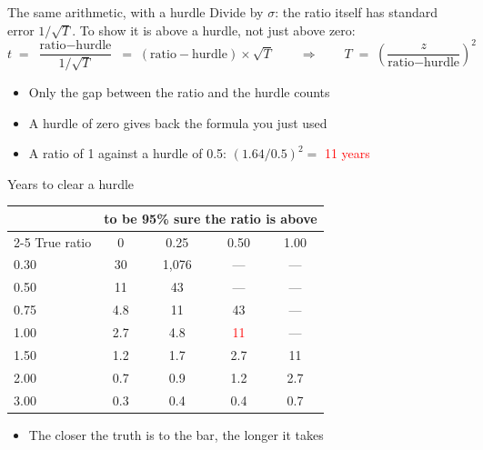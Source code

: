 \documentclass[aspectratio=169,10pt]{beamer}
\begin{document}
\begin{frame}{The same arithmetic, with a hurdle}
Divide by $\sigma$: the ratio itself has standard error $1/\sqrt{T}$. To show it is above a hurdle, not just above zero:
\vskip 6pt
\[ t \;=\; \frac{\text{ratio} - \text{hurdle}}{1/\sqrt{T}} \;=\; (\text{ratio} - \text{hurdle}) \times \sqrt{T}
   \qquad\Longrightarrow\qquad T \;=\; \left(\frac{z}{\text{ratio} - \text{hurdle}}\right)^{2} \]
\vskip 6pt
\begin{itemize}
\item Only the gap between the ratio and the hurdle counts
\vskip 6pt
\item A hurdle of zero gives back the formula you just used
\vskip 6pt
\item A ratio of 1 against a hurdle of 0.5: $(1.64 / 0.5)^2 = $ \textcolor{red}{11 years}
\end{itemize}
\end{frame}

\begin{frame}{Years to clear a hurdle}
\begin{center}
\renewcommand{\arraystretch}{1.25}
\begin{tabular}{lcccc}
\toprule
 & \multicolumn{4}{c}{to be 95\% sure the ratio is above} \\
\cmidrule(lr){2-5}
True ratio & 0 & 0.25 & 0.50 & 1.00 \\
\midrule
0.30 & 30 & 1,076 & --- & --- \\
0.50 & 11 & 43 & --- & --- \\
0.75 & 4.8 & 11 & 43 & --- \\
1.00 & 2.7 & 4.8 & \textcolor{red}{11} & --- \\
1.50 & 1.2 & 1.7 & 2.7 & 11 \\
2.00 & 0.7 & 0.9 & 1.2 & 2.7 \\
3.00 & 0.3 & 0.4 & 0.4 & 0.7 \\
\bottomrule
\end{tabular}
\end{center}
\vskip 4pt
\begin{itemize}
\item The closer the truth is to the bar, the longer it takes
\end{itemize}
\end{frame}
\end{document}
